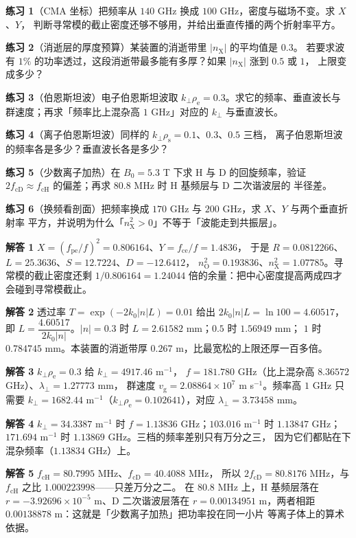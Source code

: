 \textbf{练习 1}（CMA 坐标）把频率从 $140$ GHz 换成 $100$ GHz，密度与磁场不变。求 $X$、$Y$，
判断寻常模的截止密度还够不够用，并给出垂直传播的两个折射率平方。

\textbf{练习 2}（消逝层的厚度预算）某装置的消逝带里 $|n_\mathrm{X}|$ 的平均值是 $0.3$。
若要求波有 $1\%$ 的功率透过，这段消逝带最多能有多厚？如果 $|n_\mathrm{X}|$ 涨到 $0.5$ 或 $1$，
上限变成多少？

\textbf{练习 3}（伯恩斯坦波）电子伯恩斯坦波取 $k_\perp\rho_\mathrm{e}=0.3$。求它的频率、垂直波长与
群速度；再求「频率比上混杂高 $1$ GHz」对应的 $k_\perp$ 与垂直波长。

\textbf{练习 4}（离子伯恩斯坦波）同样的 $k_\perp\rho_\mathrm{s}=0.1$、$0.3$、$0.5$ 三档，
离子伯恩斯坦波的频率各是多少？垂直波长各是多少？

\textbf{练习 5}（少数离子加热）在 $B_0=5.3$ T 下求 H 与 D 的回旋频率，验证
$2f_\mathrm{cD}\approx f_\mathrm{cH}$ 的偏差；再求 $80.8$ MHz 时 H 基频层与 D 二次谐波层的
半径差。

\textbf{练习 6}（换频看剖面）把频率换成 $170$ GHz 与 $200$ GHz，求 $X$、$Y$ 与两个垂直折射率
平方，并说明为什么「$n_\mathrm{X}^2>0$」不等于「波能走到共振层」。

\textbf{解答 1} $X=(f_\mathrm{pe}/f)^2=0.806164$、$Y=f_\mathrm{ce}/f=1.4836$，
于是 $R=0.0812266$、$L=25.3636$、$S=12.7224$、$D=-12.6412$，
$n_\mathrm{O}^2=0.193836$、$n_\mathrm{X}^2=1.07785$。寻常模的截止密度还剩
$1/0.806164=1.24044$ 倍的余量：把中心密度提高两成四才会碰到寻常模截止。

\textbf{解答 2} 透过率 $T=\exp(-2k_0|n|L)=0.01$ 给出 $2k_0|n|L=\ln 100=4.60517$，
即 $L=\dfrac{4.60517}{2k_0|n|}$。$|n|=0.3$ 时 $L=2.61582$ mm；$0.5$ 时 $1.56949$ mm；
$1$ 时 $0.784745$ mm。本装置的消逝带厚 $0.267$ m，比最宽松的上限还厚一百多倍。

\textbf{解答 3} $k_\perp\rho_\mathrm{e}=0.3$ 给 $k_\perp=4917.46$ m$^{-1}$，
$f=181.780$ GHz（比上混杂高 $8.36572$ GHz）、$\lambda_\perp=1.27773$ mm，
群速度 $v_\mathrm{g}=2.08864\times10^{7}$ m s$^{-1}$。频率高 $1$ GHz 只需要
$k_\perp=1682.44$ m$^{-1}$（$k_\perp\rho_\mathrm{e}=0.102641$），对应
$\lambda_\perp=3.73458$ mm。

\textbf{解答 4} $k_\perp=34.3387$ m$^{-1}$ 时 $f=1.13836$ GHz；$103.016$ m$^{-1}$ 时
$1.13847$ GHz；$171.694$ m$^{-1}$ 时 $1.13869$ GHz。三档的频率差别只有万分之三，
因为它们都贴在下混杂频率（$1.13834$ GHz）上。

\textbf{解答 5} $f_\mathrm{cH}=80.7995$ MHz、$f_\mathrm{cD}=40.4088$ MHz，
所以 $2f_\mathrm{cD}=80.8176$ MHz，与 $f_\mathrm{cH}$ 之比 $1.000223998$——只差万分之二。
在 $80.8$ MHz 上，H 基频层落在 $r=-3.92696\times10^{-5}$ m、D 二次谐波层落在
$r=0.00134951$ m，两者相距 $0.00138878$ m：这就是「少数离子加热」把功率投在同一小片
等离子体上的算术依据。

